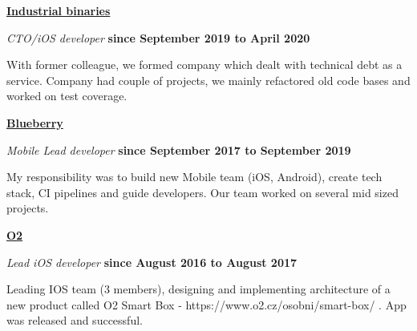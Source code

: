 \documentclass[10pt]{article}
\newenvironment{outerlist}[0]%
        {\begin{itemize}}
        {\end{itemize}
         \vspace{-.6\baselineskip}}
\newenvironment{innerlist}[0]%
        {\begin{compactitem}}
        {\end{compactitem}}
\newcommand{\blankline}{\quad\pagebreak[2]}
\begin{document}
\href{https://industrial-binaries.co/}{\textbf{Industrial binaries}}
\begin{outerlist}
  \item[] \textit{CTO/iOS developer}%
          \hfill \textbf{since September 2019 to April 2020}
  \begin{innerlist}
    \item[] With former colleague, we formed company which dealt with technical debt as a service. Company had couple of projects, we mainly refactored old code bases and worked on test coverage.
  \end{innerlist}

\end{outerlist}
\blankline

\href{https://www.blueberry.io}{\textbf{Blueberry}}
\begin{outerlist}
  \item[] \textit{Mobile Lead developer}%
          \hfill \textbf{since September 2017 to September 2019}
  \begin{innerlist}
    \item[] My responsibility was to build new Mobile team (iOS, Android), create tech stack, CI pipelines and guide developers. Our team worked on several mid sized projects.
  \end{innerlist}

\end{outerlist}
\blankline

\href{https://www.o2.cz}{\textbf{O2}}
\begin{outerlist}
  \item[] \textit{Lead iOS developer}%
          \hfill \textbf{since August 2016 to August 2017}
  \begin{innerlist}
    \item[] Leading IOS team (3 members), designing and implementing architecture of a new product called O2 Smart Box - https://www.o2.cz/osobni/smart-box/ . App was released and successful. 
  \end{innerlist}

\end{outerlist}

\blankline
\end{document}

